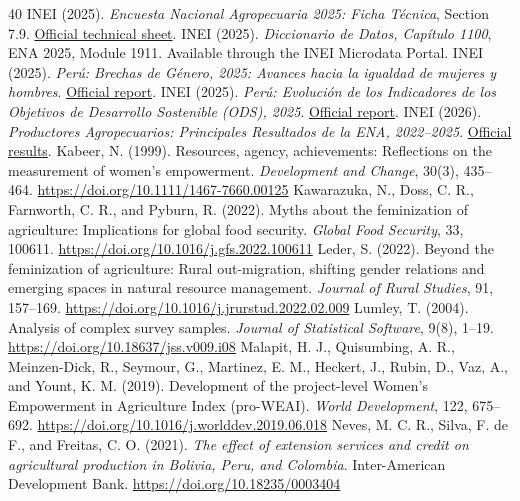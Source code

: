 \documentclass[11pt,a4paper]{article}
\begin{document}
\begin{thebibliography}{40}
 INEI (2025). \emph{Encuesta Nacional Agropecuaria 2025: Ficha T\'ecnica}, Section 7.9. \href{https://cdn.www.gob.pe/uploads/document/file/4673570/4304991-ficha-tecnica%282%29.pdf}{Official technical sheet}.
 INEI (2025). \emph{Diccionario de Datos, Cap\'itulo 1100}, ENA 2025, Module 1911. Available through the INEI Microdata Portal.
 INEI (2025). \emph{Per\'u: Brechas de G\'enero, 2025: Avances hacia la igualdad de mujeres y hombres}. \href{https://www.inei.gob.pe/media/MenuRecursivo/publicaciones_digitales/Est/Lib2054/libro.pdf}{Official report}.
 INEI (2025). \emph{Per\'u: Evoluci\'on de los Indicadores de los Objetivos de Desarrollo Sostenible (ODS), 2025}. \href{https://www.inei.gob.pe/media/MenuRecursivo/publicaciones_digitales/Est/Lib2062/libro.pdf}{Official report}.
 INEI (2026). \emph{Productores Agropecuarios: Principales Resultados de la ENA, 2022--2025}. \href{https://www.gob.pe/institucion/inei/informes-publicaciones/8259187-productores-agropecuarios-principales-resultados-de-la-encuesta-nacional-agropecuaria-ena-2022-2025}{Official results}.
 Kabeer, N. (1999). Resources, agency, achievements: Reflections on the measurement of women's empowerment. \emph{Development and Change}, 30(3), 435--464. \url{https://doi.org/10.1111/1467-7660.00125}
 Kawarazuka, N., Doss, C. R., Farnworth, C. R., and Pyburn, R. (2022). Myths about the feminization of agriculture: Implications for global food security. \emph{Global Food Security}, 33, 100611. \url{https://doi.org/10.1016/j.gfs.2022.100611}
 Leder, S. (2022). Beyond the feminization of agriculture: Rural out-migration, shifting gender relations and emerging spaces in natural resource management. \emph{Journal of Rural Studies}, 91, 157--169. \url{https://doi.org/10.1016/j.jrurstud.2022.02.009}
 Lumley, T. (2004). Analysis of complex survey samples. \emph{Journal of Statistical Software}, 9(8), 1--19. \url{https://doi.org/10.18637/jss.v009.i08}
 Malapit, H. J., Quisumbing, A. R., Meinzen-Dick, R., Seymour, G., Martinez, E. M., Heckert, J., Rubin, D., Vaz, A., and Yount, K. M. (2019). Development of the project-level Women's Empowerment in Agriculture Index (pro-WEAI). \emph{World Development}, 122, 675--692. \url{https://doi.org/10.1016/j.worlddev.2019.06.018}
 Neves, M. C. R., Silva, F. de F., and Freitas, C. O. (2021). \emph{The effect of extension services and credit on agricultural production in Bolivia, Peru, and Colombia}. Inter-American Development Bank. \url{https://doi.org/10.18235/0003404}

\end{thebibliography}
\end{document}
